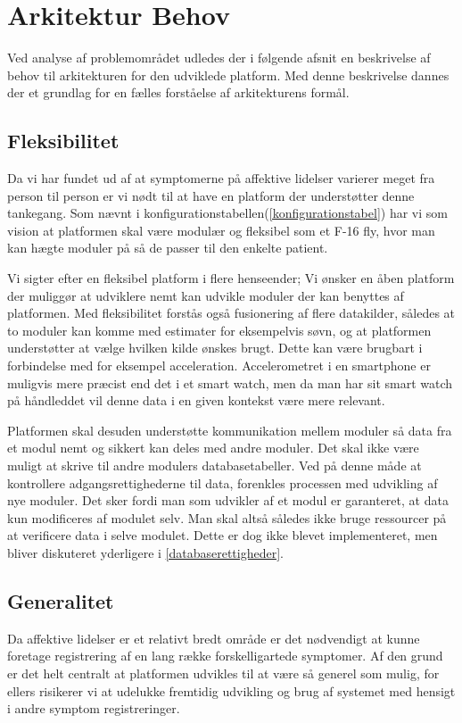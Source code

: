 \section{Arkitektur Behov}\label{arkitekturkrav}
Ved analyse af problemområdet udledes der i følgende afsnit en beskrivelse af behov til arkitekturen for den udviklede platform.
Med denne beskrivelse dannes der et grundlag for en fælles forståelse af arkitekturens formål.

\subsection{Fleksibilitet}
Da vi har fundet ud af at symptomerne på affektive lidelser varierer meget fra person til person er vi nødt til at have en platform der understøtter denne tankegang.
Som nævnt i konfigurationstabellen(\cref{konfigurationstabel}) har vi som vision at platformen skal være modulær og fleksibel som et F-16 fly, hvor man kan hægte moduler på så de passer til den enkelte patient.

Vi sigter efter en fleksibel platform i flere henseender;
Vi ønsker en åben platform der muliggør at udviklere nemt kan udvikle moduler der kan benyttes af platformen.
Med fleksibilitet forstås også fusionering af flere datakilder, således at to moduler kan komme med estimater for eksempelvis søvn, og at platformen understøtter at vælge hvilken kilde ønskes brugt.
Dette kan være brugbart i forbindelse med for eksempel acceleration.
Accelerometret i en smartphone er muligvis mere præcist end det i et smart watch, men da man har sit smart watch på håndleddet vil denne data i en given kontekst være mere relevant.

Platformen skal desuden understøtte kommunikation mellem moduler så data fra et modul nemt og sikkert kan deles med andre moduler.
Det skal ikke være muligt at skrive til andre modulers databasetabeller.
Ved på denne måde at kontrollere adgangsrettighederne til data, forenkles processen med udvikling af nye moduler.
Det sker fordi man som udvikler af et modul er garanteret, at data kun modificeres af modulet selv.
Man skal altså således ikke bruge ressourcer på at verificere data i selve modulet.
Dette er dog ikke blevet implementeret, men bliver diskuteret yderligere i \cref{databaserettigheder}.

\subsection{Generalitet}
Da affektive lidelser er et relativt bredt område er det nødvendigt at kunne foretage registrering af en lang række forskelligartede symptomer.
Af den grund er det helt centralt at platformen udvikles til at være så generel som mulig, for ellers risikerer vi at udelukke fremtidig udvikling og brug af systemet med hensigt i andre symptom registreringer.
